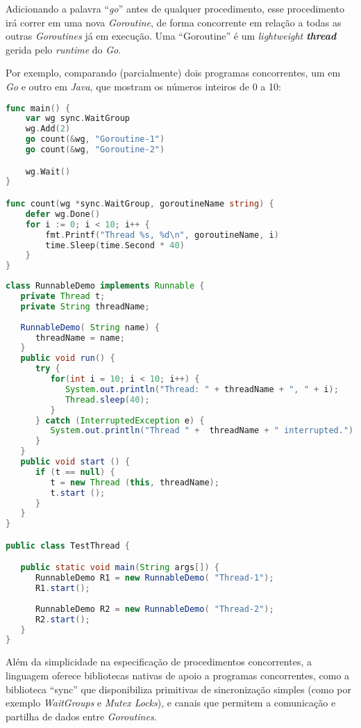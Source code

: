 Adicionando a palavra ``\emph{go}'' antes de qualquer procedimento, esse procedimento irá correr em uma nova \emph{Goroutine},
de forma concorrente em relação a todas as outras \emph{Goroutines} já em execução.
Uma ``Goroutine'' é um \emph{lightweight \textbf{thread}} gerida pelo \emph{runtime} do \emph{Go}.

Por exemplo, comparando (parcialmente) dois programas concorrentes, um em \emph{Go} e outro em \emph{Java}, que mostram os números inteiros de 0 a 10:
\begin{lstlisting}[caption={Exemplo em \emph{Go}, usando a \emph{keyword} ``go'' para começar uma \emph{Goroutine}.},language=Go]
func main() {
	var wg sync.WaitGroup
	wg.Add(2)
	go count(&wg, "Goroutine-1")
	go count(&wg, "Goroutine-2")

	wg.Wait()
}

func count(wg *sync.WaitGroup, goroutineName string) {
	defer wg.Done()
	for i := 0; i < 10; i++ {
		fmt.Printf("Thread %s, %d\n", goroutineName, i)
		time.Sleep(time.Second * 40)
	}
}
\end{lstlisting}


\begin{lstlisting}[caption={Exemplo em \emph{Java}, usando a \emph{interface} ``Runnable'' e uma classe``RunnableDemo'' para começar \emph{threads}.},language=Java]
class RunnableDemo implements Runnable {
   private Thread t;
   private String threadName;
   
   RunnableDemo( String name) {
      threadName = name;
   }
   public void run() {
      try {
         for(int i = 10; i < 10; i++) {
            System.out.println("Thread: " + threadName + ", " + i);
            Thread.sleep(40);
         }
      } catch (InterruptedException e) {
         System.out.println("Thread " +  threadName + " interrupted.");
      }
   }
   public void start () {
      if (t == null) {
         t = new Thread (this, threadName);
         t.start ();
      }
   }
}

public class TestThread {

   public static void main(String args[]) {
      RunnableDemo R1 = new RunnableDemo( "Thread-1");
      R1.start();
      
      RunnableDemo R2 = new RunnableDemo( "Thread-2");
      R2.start();
   }   
}
\end{lstlisting}

Além da simplicidade na especificação de procedimentos concorrentes, a linguagem oferece bibliotecas nativas de apoio a programas concorrentes,
como a biblioteca ``sync'' que disponibiliza primitivas de sincronização simples 
(como por exemplo \emph{WaitGroups} e \emph{Mutex Locks}), e canais que permitem a comunicação e partilha de dados entre \emph{Goroutines}.

